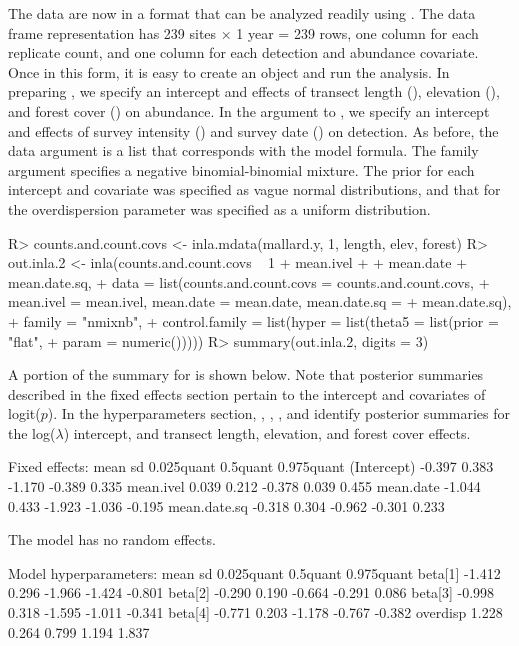 \documentclass[codesnippet]{jss}
\begin{document}
The data are now in a format that can be analyzed readily using 
. The data frame representation has 239 sites $\times$ 1 year = 
239 rows, one 
column for each replicate count, and one column for each detection and 
abundance covariate. Once in this form, it is easy to create an 
 object and run the analysis. In preparing 
, we specify an intercept and effects of 
transect length (), elevation (), and forest cover 
() on abundance. In the  argument to , 
we specify an intercept and effects of survey intensity () and 
survey date () on detection. As before, the data argument is a 
list that corresponds with the model formula. The family argument specifies 
a negative binomial-binomial mixture. The prior for each intercept and 
covariate was specified as vague normal distributions, and that for the 
overdispersion parameter was specified as a uniform distribution. 

\begin{CodeInput}
R> counts.and.count.covs <- inla.mdata(mallard.y, 1, length, elev, forest)
R> out.inla.2 <- inla(counts.and.count.covs ~ 1 + mean.ivel +
+    mean.date + mean.date.sq, 
+    data = list(counts.and.count.covs = counts.and.count.covs, 
+      mean.ivel = mean.ivel, mean.date = mean.date, mean.date.sq = 
+      mean.date.sq), 
+    family = "nmixnb", 
+    control.family = list(hyper = list(theta5 = list(prior = "flat",
+      param = numeric()))))
R> summary(out.inla.2, digits = 3)
\end{CodeInput}

A portion of the summary for  is shown below. Note that 
posterior summaries described in the fixed effects section pertain to the 
intercept and covariates of logit($p$). In the hyperparameters section, 
, , , and  identify 
posterior summaries for the log($\lambda$) intercept, and transect length, 
elevation, and forest cover effects.

\begin{CodeOutput}
Fixed effects:
               mean    sd 0.025quant  0.5quant  0.975quant
(Intercept)  -0.397 0.383     -1.170    -0.389       0.335
mean.ivel     0.039 0.212     -0.378     0.039       0.455
mean.date    -1.044 0.433     -1.923    -1.036      -0.195
mean.date.sq -0.318 0.304     -0.962    -0.301       0.233

The model has no random effects.

Model hyperparameters:
             mean     sd  0.025quant  0.5quant  0.975quant
beta[1]    -1.412  0.296      -1.966    -1.424      -0.801 
beta[2]    -0.290  0.190      -0.664    -0.291       0.086
beta[3]    -0.998  0.318      -1.595    -1.011      -0.341
beta[4]    -0.771  0.203      -1.178    -0.767      -0.382
overdisp    1.228  0.264       0.799     1.194       1.837
\end{CodeOutput}
\end{document}
